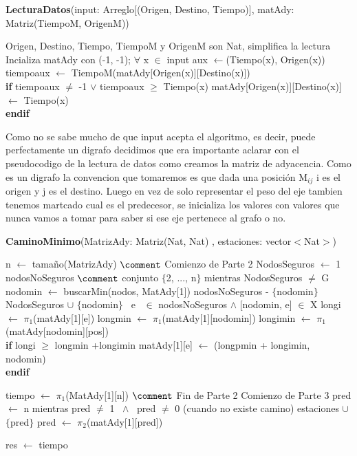 \documentclass[spanish,12pt]{article}
\begin{document}
\begin{algorithm}[H]{\textbf{LecturaDatos}(input: Arreglo[(Origen, Destino, Tiempo)], matAdy: Matriz(TiempoM, OrigenM))}
	\begin{algorithmic}[1]
		\State Origen, Destino, Tiempo, TiempoM y OrigenM son Nat, simplifica la lectura
		\State Incializa matAdy con (-1, -1);
		\State $\forall$ x $\in$ input
		\State \quad aux $\gets$(Tiempo(x), Origen(x))
		\State \quad tiempoaux $\gets$ TiempoM(matAdy[Origen(x)][Destino(x)])
\\
		\qquad \textbf{if} tiempoaux $\neq$ -1 $\vee$ tiempoaux $\geq$ Tiempo(x)
			\State \qquad \quad matAdy[Origen(x)][Destino(x)] $\gets$ Tiempo(x)
\\
		 \qquad \textbf{endif}
	\end{algorithmic}
\end{algorithm}

	Como no se sabe mucho de que input acepta el algoritmo, es decir, puede perfectamente un digrafo decidimos que era importante aclarar con el pseudocodigo de la lectura de datos como creamos la matriz de adyacencia. Como es un digrafo la convencion que tomaremos es que dada una posición M$_{ij}$ i es el origen y j es el destino. Luego en vez de solo representar el peso del eje tambien tenemos martcado cual es el predecesor, se inicializa los valores con valores que nunca vamos a tomar para saber si ese eje pertenece al grafo o no.

\begin{algorithm}[H]{\textbf{CaminoMinimo}(MatrizAdy: Matriz(Nat, Nat) , estaciones: vector$<$Nat$>$)}
	\begin{algorithmic}[1]

		\State n $\gets$ tamaño(MatrizAdy) $\comment$ Comienzo de Parte 2
		\State NodosSeguros $\gets$ 1
		\State nodosNoSeguros $\comment$ conjunto $\{$2, ..., n$\}$
		\State mientras NodosSeguros $\neq$ G
		\State \quad nodomin $\gets$ buscarMin(nodos, MatAdy[1])
		\State \quad nodosNoSeguros - $\{$nodomin$\}$
		\State \quad NodosSeguros $\cup$ $\{$nodomin$\}$
		\State \quad \forall \ e \ $\in$ nodosNoSeguros $\land$ [nodomin, e] $\in$ X
		\State \qquad longi $\gets$ $\pi_{1}$(matAdy[1][e])
		\State \qquad longmin $\gets$ $\pi_{1}$(matAdy[1][nodomin])
		\State \qquad longimin $\gets$ $\pi_{1}$(matAdy[nodomin][pos])
\\
		\qquad \textbf{if} longi $\geq$ longmin +longimin
			\State \qquad \quad matAdy[1][e] $\gets$ (longpmin + longimin, nodomin)
\\
 \qquad \textbf{endif}

		\State tiempo $\gets$ $\pi_{1}$(MatAdy[1][n]) $\comment$ Fin de Parte 2 Comienzo de Parte 3
		\State pred $\gets$ n
		\State mientras pred $\neq$ 1 \ $\land$ \ pred $\neq$ 0 (cuando no existe camino)
		\State \quad estaciones $\cup$ $\{$pred$\}$
		\State \quad pred $\gets$ $\pi_{2}$(matAdy[1][pred])

		\State res $\gets$ tiempo
 	\end{algorithmic}
\end{algorithm}
\end{document}
